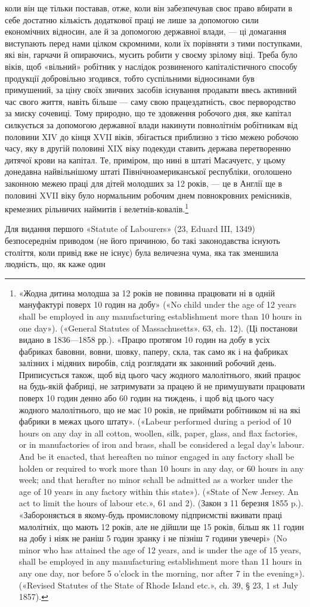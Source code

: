 коли він ще тільки поставав, отже, коли він забезпечував своє
право вбирати в себе достатню кількість додаткової праці не
лише за допомогою сили економічних відносин, але й за допомогою
державної влади, — ці домагання виступають перед нами
цілком скромними, коли їх порівняти з тими поступками, які
він, гарчачи й опираючись, мусить робити у своєму зрілому віці.
Треба було віків, щоб «вільний» робітник у наслідок розвиненого
капіталістичного способу продукції добровільно згодився, тобто
суспільними відносинами був примушений, за ціну своїх звичних
засобів існування продавати ввесь активний час свого
життя, навіть більше — саму свою працездатність, своє первородство
за миску сочевиці. Тому природно, що те здовження
робочого дня, яке капітал силкується за допомогою державної
влади накинути повнолітнім робітникам від половини XIV до
кінця XVII віків, збігається приблизно з тією межею робочою
часу, яку в другій половині XIX віку подекуди ставить держава
перетворенню дитячої крови на капітал. Те, приміром, що нині
в штаті Масачуетс, у цьому донедавна найвільнішому штаті
Північноамериканської республіки, оголошено законною межею
праці для дітей молодших за 12 років, — це в Англії ще в половині
XVII віку було нормальним робочим днем повнокровних ремісників,
кремезних рільничих наймитів і велетнів-ковалів.\footnote{
«Жодна дитина молодша за 12 років не повинна працювати ні в
одній мануфактурі поверх 10 годин на добу» («No child under the age
of 12 years shall be employed in any manufacturing establishment more
than 10 hours in one day»). («General Statutes of Massachusetts». 63, ch. 12).
(Ці постанови видано в 1836—1858 рр.). «Працю протягом 10 годин на
добу в усіх фабриках бавовни, вовни, шовку, паперу, скла, так само як
і на фабриках залізних і мідяних виробів, слід розглядати як законний
робочий день. Приписується також, щоб від цього часу жодного малолітнього,
який працює на будь-якій фабриці, не затримувати за працею й
не примушувати працювати поверх 10 годин денно або 60 годин на тиждень,
і щоб від цього часу жодного малолітнього, що не має 10 років, не приймати
робітником ні на які фабрики в межах цього штату». («Labeur performed
during a period of 10 hours on any day in all cotton, woollen, silk,
paper, glass, and flax factories, or in manufactories of iron and brass,
shall be considered a legal day’s labour. And be it enacted, that hereaften
no minor engaged in any factory shall be holden or required to work more
than 10 hours in any day, or 60 hours in any week; and that herafter no
minor schall be admitted as a worker under the age of 10 years in any factory
within this state»). («State of New Jersey. An act to limit the hours of labour
etc.», 61 and 2). (Закон з 11 березня 1855 p.). «Забороняється в якому-будь
промисловому підприємстві вживати праці малолітніх, що мають
12 років, але не дійшли ще 15 років, більш як 11 годин на добу і ніяк не
раніш 5 годин зранку і не пізніш 7 години увечері» (No minor who has
attained the age of 12 years, and is under the age of 15 years, shall be employed
in any manufacturing establishment more than 11 hours in any one day,
nor before 5 o’clock in the morning, nor after 7 in the evening»). («Revised
Statutes of the State of Rhode Island etc.», ch. 39, § 23, 1 st July 1857).
}

Для видання першого «Statute of Labourers» (23, Eduard
III, 1349) безпосереднім приводом (не його причиною, бо такі
законодавства існують століття, коли привід вже не існує) була
величезна чума, яка так зменшила людність, що, як каже один